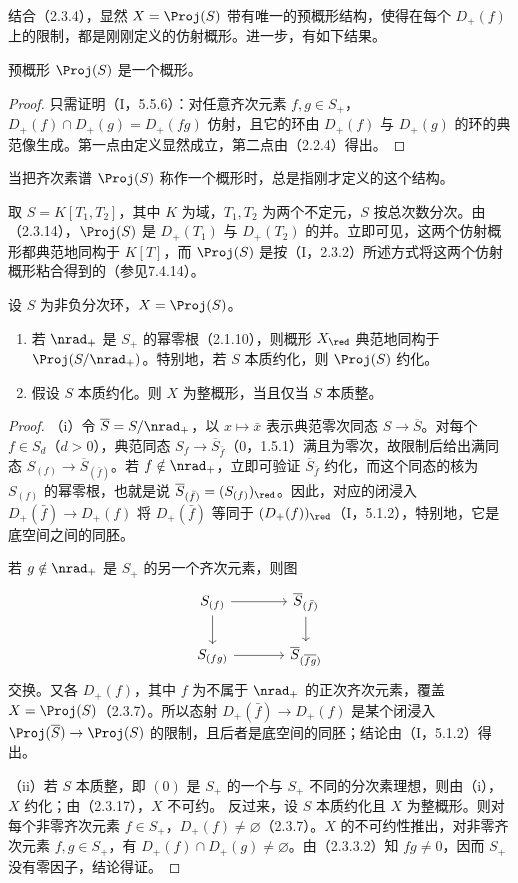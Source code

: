 结合（2.3.4），显然 $X=\Proj(S)$ 带有唯一的预概形结构，使得在每个 $D_+(f)$ 上的限制，都是刚刚定义的仿射概形。进一步，有如下结果。

预概形 $\Proj(S)$ 是一个概形。
\begin{proof}
只需证明（I，5.5.6）：对任意齐次元素 $f,g\in S_+$，
$D_+(f)\cap D_+(g)=D_+(fg)$ 仿射，且它的环由 $D_+(f)$ 与 $D_+(g)$ 的环的典范像生成。第一点由定义显然成立，第二点由（2.2.4）得出。
\end{proof}
当把齐次素谱 $\Proj(S)$ 称作一个概形时，总是指刚才定义的这个结构。

取 $S=K[T_1,T_2]$，其中 $K$ 为域，$T_1,T_2$ 为两个不定元，$S$ 按总次数分次。由（2.3.14），$\Proj(S)$ 是 $D_+(T_1)$ 与 $D_+(T_2)$ 的并。立即可见，这两个仿射概形都典范地同构于 $K[T]$，而 $\Proj(S)$ 是按（I，2.3.2）所述方式将这两个仿射概形粘合得到的（参见7.4.14）。

设 $S$ 为非负分次环，$X=\Proj(S)$。
\begin{enumerate}[label=(\roman*)]
\item 若 $\nrad_+$ 是 $S_+$ 的幂零根（2.1.10），则概形 $X_{\red}$ 典范地同构于 $\Proj(S/\nrad_+)$。特别地，若 $S$ 本质约化，则 $\Proj(S)$ 约化。
\item 假设 $S$ 本质约化。则 $X$ 为整概形，当且仅当 $S$ 本质整。
\end{enumerate}
\begin{proof}
（i）令 $\overline S=S/\nrad_+$，以 $x\mapsto\bar x$ 表示典范零次同态 $S\to\overline S$。对每个 $f\in S_d$（$d>0$），典范同态 $S_f\to\overline S_{\bar f}$（0，1.5.1）满且为零次，故限制后给出满同态
$S_{(f)}\to\overline S_{(\bar f)}$。若 $f\notin\nrad_+$，立即可验证 $\overline S_{\bar f}$ 约化，而这个同态的核为 $S_{(f)}$ 的幂零根，也就是说
$\overline S_{(\bar f)}=(S_{(f)})_{\red}$。因此，对应的闭浸入
$D_+(\bar f)\to D_+(f)$ 将 $D_+(\bar f)$ 等同于 $(D_+(f))_{\red}$（I，5.1.2），特别地，它是底空间之间的同胚。

若 $g\notin\nrad_+$ 是 $S_+$ 的另一个齐次元素，则图
\[
\begin{tikzcd}[column sep=large]
S_{(f)} \arrow[r] \arrow[d] & \overline S_{(\bar f)} \arrow[d]\\
S_{(fg)} \arrow[r] & \overline S_{(\overline{fg})}
\end{tikzcd}
\]
交换。又各 $D_+(f)$，其中 $f$ 为不属于 $\nrad_+$ 的正次齐次元素，覆盖 $X=\Proj(S)$（2.3.7）。所以态射
$D_+(\bar f)\to D_+(f)$ 是某个闭浸入 $\Proj(\overline S)\to\Proj(S)$ 的限制，且后者是底空间的同胚；结论由（I，5.1.2）得出。

（ii）若 $S$ 本质整，即 $(0)$ 是 $S_+$ 的一个与 $S_+$ 不同的分次素理想，则由（i），$X$ 约化；由（2.3.17），$X$ 不可约。
反过来，设 $S$ 本质约化且 $X$ 为整概形。则对每个非零齐次元素 $f\in S_+$，$D_+(f)\ne\varnothing$（2.3.7）。$X$ 的不可约性推出，对非零齐次元素 $f,g\in S_+$，有
$D_+(f)\cap D_+(g)\ne\varnothing$。由（2.3.3.2）知 $fg\ne0$，因而 $S_+$ 没有零因子，结论得证。
\end{proof}

